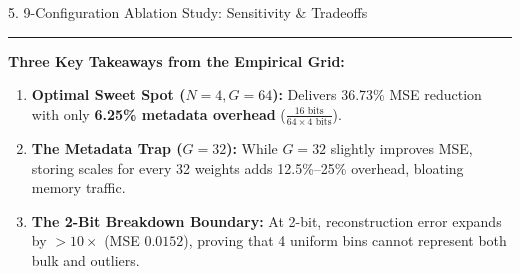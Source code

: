\documentclass[aspectratio=169, 10pt]{beamer}
\begin{document}
\begin{frame}{5. 9-Configuration Ablation Study: Sensitivity \& Tradeoffs}
  \vspace{0.15cm}
  \hrule
  \vspace{0.1cm}
  \footnotesize
  \textbf{Three Key Takeaways from the Empirical Grid:}
  \begin{enumerate}
    \setlength{\itemsep}{0.08em}
    \item \textbf{Optimal Sweet Spot ($N=4, G=64$):} Delivers 36.73\% MSE reduction with only \textbf{6.25\% metadata overhead} ($\frac{16\text{ bits}}{64 \times 4\text{ bits}}$).
    \item \textbf{The Metadata Trap ($G=32$):} While $G=32$ slightly improves MSE, storing scales for every 32 weights adds 12.5\%--25\% overhead, bloating memory traffic.
    \item \textbf{The 2-Bit Breakdown Boundary:} At 2-bit, reconstruction error expands by $>10\times$ (MSE $0.0152$), proving that 4 uniform bins cannot represent both bulk and outliers.
  \end{enumerate}
\end{frame}
\end{document}
